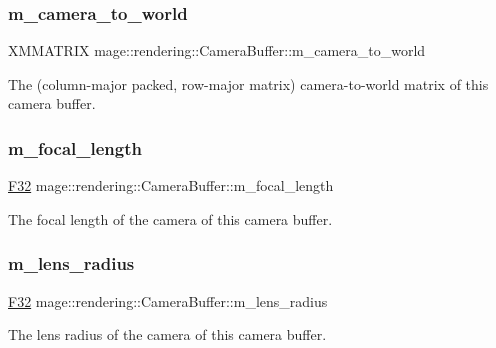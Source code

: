 \subsubsection{\texorpdfstring{m\+\_\+camera\+\_\+to\+\_\+world}{m\_camera\_to\_world}}
{\footnotesize\ttfamily X\+M\+M\+A\+T\+R\+IX mage\+::rendering\+::\+Camera\+Buffer\+::m\+\_\+camera\+\_\+to\+\_\+world}

The (column-\/major packed, row-\/major matrix) camera-\/to-\/world matrix of this camera buffer. \hypertarget{structmage_1_1rendering_1_1_camera_buffer_a7ed5079582d476597f8bc4d6a0b3f372}{}\label{structmage_1_1rendering_1_1_camera_buffer_a7ed5079582d476597f8bc4d6a0b3f372} 
\subsubsection{\texorpdfstring{m\+\_\+focal\+\_\+length}{m\_focal\_length}}
{\footnotesize\ttfamily \hyperlink{namespacemage_aa97e833b45f06d60a0a9c4fc22ae02c0}{F32} mage\+::rendering\+::\+Camera\+Buffer\+::m\+\_\+focal\+\_\+length}

The focal length of the camera of this camera buffer. \hypertarget{structmage_1_1rendering_1_1_camera_buffer_a7915bec843e03ad2248c08b10317ccc7}{}\label{structmage_1_1rendering_1_1_camera_buffer_a7915bec843e03ad2248c08b10317ccc7} 
\subsubsection{\texorpdfstring{m\+\_\+lens\+\_\+radius}{m\_lens\_radius}}
{\footnotesize\ttfamily \hyperlink{namespacemage_aa97e833b45f06d60a0a9c4fc22ae02c0}{F32} mage\+::rendering\+::\+Camera\+Buffer\+::m\+\_\+lens\+\_\+radius}

The lens radius of the camera of this camera buffer. \hypertarget{structmage_1_1rendering_1_1_camera_buffer_a3273510e0a7bbdd9481fe67f9e223f59}{}\label{structmage_1_1rendering_1_1_camera_buffer_a3273510e0a7bbdd9481fe67f9e223f59} 
